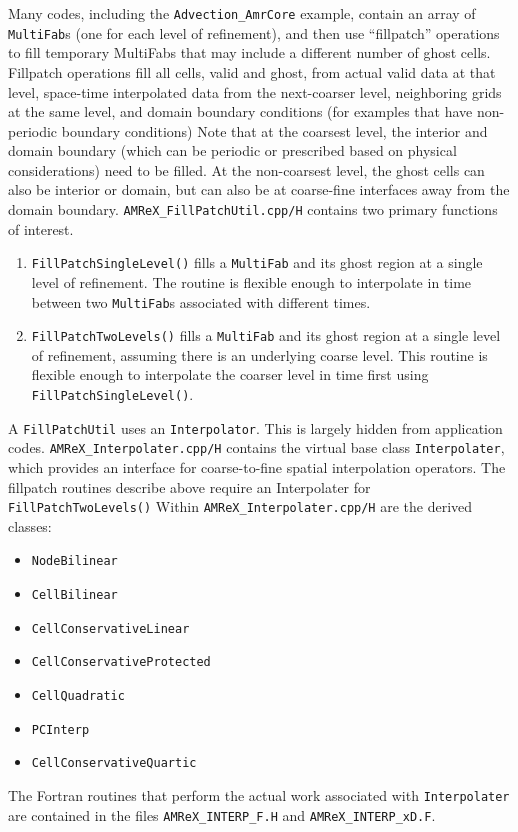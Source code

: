 Many codes, including the {\tt Advection\_AmrCore} example, contain an array of {\tt MultiFab}s
(one for each level of refinement), and then use ``fillpatch'' operations to fill temporary
MultiFabs that may include a different number of ghost cells.  Fillpatch operations fill
all cells, valid and ghost, from actual valid data at that level, space-time interpolated data 
from the next-coarser level, neighboring grids at the same level, and domain
boundary conditions (for examples that have non-periodic boundary conditions)
Note that at the coarsest level,
the interior and domain boundary (which can be periodic or prescribed based on physical considerations)
need to be filled.  At the non-coarsest level, the ghost cells can also be interior or domain,
but can also be at coarse-fine interfaces away from the domain boundary.
{\tt AMReX\_FillPatchUtil.cpp/H} contains two primary functions of interest.
\begin{enumerate}
\item {\tt FillPatchSingleLevel()} fills a {\tt MultiFab} and its ghost region at a single level of 
refinement.  The routine is flexible enough to interpolate in time between two {\tt MultiFab}s
associated with different times.
\item {\tt FillPatchTwoLevels()} fills a {\tt MultiFab} and its ghost region at a single level of 
refinement, assuming there is an underlying coarse level.  This routine is flexible enough to interpolate
the coarser level in time first using {\tt FillPatchSingleLevel()}.
\end{enumerate}

A {\tt FillPatchUtil} uses an {\tt Interpolator}.  This is largely hidden from application codes.
{\tt AMReX\_Interpolater.cpp/H} contains the virtual base class {\tt Interpolater}, which provides
an interface for coarse-to-fine spatial interpolation operators.  The fillpatch routines describe
above require an Interpolater for {\tt FillPatchTwoLevels()}
Within {\tt AMReX\_Interpolater.cpp/H} are the derived classes:
\begin{itemize}
\item {\tt NodeBilinear}
\item {\tt CellBilinear}
\item {\tt CellConservativeLinear}
\item {\tt CellConservativeProtected}
\item {\tt CellQuadratic}
\item {\tt PCInterp}
\item {\tt CellConservativeQuartic}
\end{itemize}
The Fortran routines that perform the actual work associated with {\tt Interpolater} are 
contained in the files {\tt AMReX\_INTERP\_F.H} and {\tt AMReX\_INTERP\_xD.F}.

